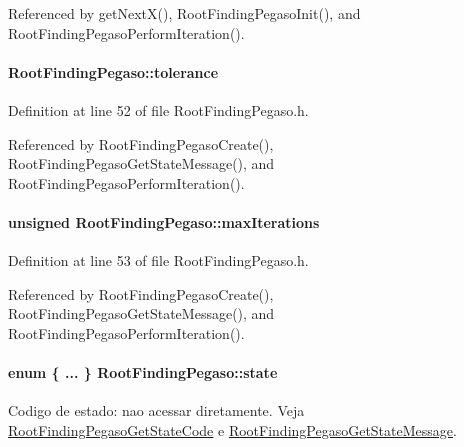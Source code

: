 Referenced by getNextX(), RootFindingPegasoInit(), and RootFindingPegasoPerformIteration().\hypertarget{structRootFindingPegaso_a52c433bf87d623c6079a6bed04a2ca1}{
\paragraph[tolerance]{ {\bf RootFindingPegaso::tolerance}}\hfill}
\label{structRootFindingPegaso_a52c433bf87d623c6079a6bed04a2ca1}




Definition at line 52 of file RootFindingPegaso.h.

Referenced by RootFindingPegasoCreate(), RootFindingPegasoGetStateMessage(), and RootFindingPegasoPerformIteration().\hypertarget{structRootFindingPegaso_f201e2c5a08bd0469255e21783f93fff}{
\paragraph[maxIterations]{\setlength{\rightskip}{0pt plus 5cm}unsigned {\bf RootFindingPegaso::maxIterations}}\hfill}
\label{structRootFindingPegaso_f201e2c5a08bd0469255e21783f93fff}




Definition at line 53 of file RootFindingPegaso.h.

Referenced by RootFindingPegasoCreate(), RootFindingPegasoGetStateMessage(), and RootFindingPegasoPerformIteration().\hypertarget{structRootFindingPegaso_e02d9e369d5ea543206b764a80256ae3}{
\paragraph[state]{\setlength{\rightskip}{0pt plus 5cm}enum \{ ... \}   {\bf RootFindingPegaso::state}}\hfill}
\label{structRootFindingPegaso_e02d9e369d5ea543206b764a80256ae3}


Codigo de estado: nao acessar diretamente. Veja \hyperlink{group____pegaso_g83892750b865aa977fcdba83922ad6fb}{RootFindingPegasoGetStateCode} e \hyperlink{group____pegaso_g2328683ae067772b11e3127fe800448d}{RootFindingPegasoGetStateMessage}. 



